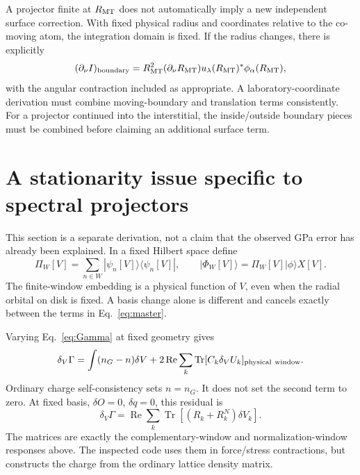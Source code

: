 \documentclass[11pt]{article}
\newcommand{\Tr}{\operatorname{Tr}}
\newcommand{\Rea}{\operatorname{Re}}
\newcommand{\dd}{\partial_\nu}
\begin{document}
A projector finite at $R_{\rm MT}$ does not automatically imply a new
independent surface correction. With fixed physical radius and coordinates
relative to the co-moving atom, the integration domain is fixed. If the
radius changes, there is explicitly
\begin{equation}
(\dd I)_{\rm boundary}=R_{\rm MT}^2(\dd R_{\rm MT})
 u_\lambda(R_{\rm MT})^*\phi_\alpha(R_{\rm MT}),
\end{equation}
with the angular contraction included as appropriate. A laboratory-coordinate
derivation must combine moving-boundary and translation terms consistently.
For a projector continued into the interstitial, the inside/outside boundary
pieces must be combined before claiming an additional surface term.

\section{A stationarity issue specific to spectral projectors}
This section is a separate derivation, not a claim that the observed GPa
error has already been explained. In a fixed Hilbert space define
\begin{equation}
\Pi_W[V]=\sum_{n\in W}|\psi_n[V]\rangle\langle\psi_n[V]|,
\qquad |\Phi_W[V]\rangle=\Pi_W[V]|\phi\rangle X[V].
\end{equation}
The finite-window embedding is a physical function of $V$, even when the
radial orbital on disk is fixed. A basis change alone is different and
cancels exactly between the terms in Eq.~\eqref{eq:master}.

Varying Eq.~\eqref{eq:Gamma} at fixed geometry gives
\begin{equation}
\delta_V\Gamma=\int(n_G-n)\delta V
       +2\Rea\sum_k\Tr[C_k\delta_V U_k]_{\rm physical\ window}.
\label{eq:Vstationary}
\end{equation}
Ordinary charge self-consistency sets $n=n_G$. It does not set the second
term to zero. At fixed basis, $\delta O=0$, $\delta q=0$, this residual is
\begin{equation}
\delta_V\Gamma=\Rea\sum_k\Tr[(R_k+R_k^N)\delta V_k].\label{eq:RV}
\end{equation}
The matrices are exactly the complementary-window and normalization-window
responses above. The inspected code uses them in force/stress contractions,
but constructs the charge from the ordinary lattice density matrix.
\end{document}
